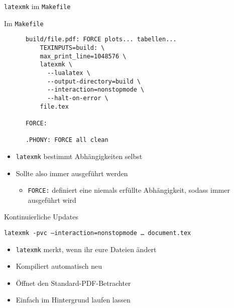 \begin{frame}[fragile]{\texttt{latexmk} im \texttt{Makefile}}
  \begin{block}{Im \texttt{Makefile}}
    \begin{verbatim}
      build/file.pdf: FORCE plots... tabellen...
          TEXINPUTS=build: \
          max_print_line=1048576 \
          latexmk \
            --lualatex \
            --output-directory=build \
            --interaction=nonstopmode \
            --halt-on-error \
          file.tex

      FORCE:

      .PHONY: FORCE all clean
    \end{verbatim}
  \end{block}

  \begin{itemize}
    \item \texttt{latexmk} bestimmt Abhängigkeiten selbst
    \item Sollte also immer ausgeführt werden
      \begin{itemize}
        \item \texttt{FORCE:} definiert eine niemals erfüllte Abhängigkeit, sodass immer ausgeführt wird
      \end{itemize}
  \end{itemize}
\end{frame}
\begin{frame}{Kontinuierliche Updates}
  \begin{center}
    \texttt{latexmk \alert{-pvc} --interaction=nonstopmode … document.tex}
  \end{center}
  \begin{itemize}
    \item \texttt{latexmk} merkt, wenn ihr eure Dateien ändert
    \item Kompiliert automatisch neu
    \item Öffnet den Standard-PDF-Betrachter
    \item Einfach im Hintergrund laufen lassen
  \end{itemize}
\end{frame}
